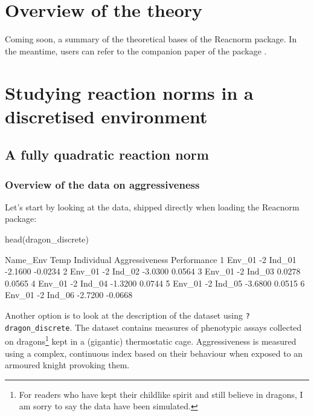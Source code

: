 \documentclass[a4paper,12pt,twoside]{article}
\begin{document}
\section{Overview of the theory}

Coming soon, a summary of the theoretical bases of the Reacnorm package. In the meantime, users can refer to the companion paper of the package \autocite{devillemereuil_partitioning_2025}.


\section{Studying reaction norms in a discretised environment}

\subsection{A fully quadratic reaction norm}

\subsubsection{Overview of the data on aggressiveness}

Let's start by looking at the data, shipped directly when loading the Reacnorm package:
\begin{Rinput}
head(dragon_discrete)
\end{Rinput}
\begin{Routput}
  Name_Env Temp Individual Aggressiveness Performance
1   Env_01   -2     Ind_01        -2.1600     -0.0234
2   Env_01   -2     Ind_02        -3.0300      0.0564
3   Env_01   -2     Ind_03         0.0278      0.0565
4   Env_01   -2     Ind_04        -1.3200      0.0744
5   Env_01   -2     Ind_05        -3.6800      0.0515
6   Env_01   -2     Ind_06        -2.7200     -0.0668
\end{Routput}
Another option is to look at the description of the dataset using \texttt{?dragon\_discrete}.
The dataset contains measures of phenotypic assays collected on dragons\footnote{For readers who have kept their childlike spirit and still believe in dragons, I am sorry to say the data have been simulated.} kept in a (gigantic) thermostatic cage. Aggressiveness is measured using a complex, continuous index based on their behaviour when exposed to an armoured knight provoking them.
\end{document}
